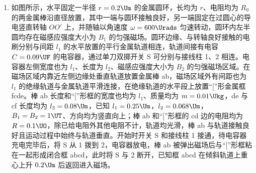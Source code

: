 \documentclass[\gkver]{gaokaozhenti}
\begin{document}
\begin{enumerate}
{	$mgl\sin37^{\circ}+mgR(1-\cos37^{\circ})=\frac{1}{2}mv_{C}^{2}$

	C 点时

	$F_{N}-mg=m\frac{v_{C}^{2}}{R}$

	$F_{N}=7\UN$

	（2）

	$mgl_{x}\sin37^{\circ}-4mgR\cos37^{\circ}=\frac{1}{2}mv^{2}$

	$v=\sqrt{12l_{x}-9.6}$

	能过最高点时，则能到 F 点，则恰到最高点时

	$mgl_{x}\sin37^{\circ}-mg(3R\cos37^{\circ}+R)=0$

	$l_{x}\geq0.85\Um$

	（3）设摩擦力做功为第一次到达中点时的 $n$ 倍

	$mgl_{x}\sin37^{\circ}-mg\frac{l_{FG}}{2}\sin37^{\circ}-n\mu mg\frac{l_{FG}}{2}\cos37^{\circ}=0$

	解得

	$l_{x}=\frac{7n+6}{15}$

	当 $n=1$ 时，$l_{x1}=\frac{13}{15}\Um$；当 $n=3$ 时，$l_{x2}=\frac{9}{5}\Um$；当 $n=5$ 时，$l_{x3}=\frac{41}{15}\Um$。
}

\item
如图所示，水平固定一半径 $r=0.2\Um$ 的金属圆环，长均为 $r$、电阻均为 $R_{0}$ 的两金属棒沿直径放置，其中一端与圆环接触良好，另一端固定在过圆心的导电竖直转轴 $OO'$ 上，并随轴以角速度 $\omega=600\Urads$ 匀速转动，圆环内左半圆均存在磁感应强度大小为 $B_{1}$ 的匀强磁场。圆环边缘、与转轴良好接触的电刷分别与间距 $l_{1}$ 的水平放置的平行金属轨道相连，轨道间接有电容 $C=0.09\UF$ 的电容器，通过单刀双掷开关 S 可分别与接线柱 1、2 相连。电容器左侧宽度也为 $l_{1}$、长度为 $l_{2}$、磁感应强度大小为 $B_{2}$ 的匀强磁场区域。在磁场区域内靠近左侧边缘处垂直轨道放置金属棒 ab，磁场区域外有间距也为 $l_{1}$ 的绝缘轨道与金属轨道平滑连接，在绝缘轨道的水平段上放置“[”形金属框 fcde。棒 ab 长度和“[”形框的宽度也均为 $l_{1}$、质量均为 $m=0.01\Ukg$，de 与 cf 长度均为 $l_{3}=0.08\Um$，已知 $l_{1}=0.25\Um$，$l_{2}=0.068\Um$，$B_{1}=B_{2}=1\UT$、方向均为竖直向上；棒 ab 和“[”形框的 cd 边的电阻均为 $R=0.1\UO$，除已给电阻外其他电阻不计，轨道均光滑，棒 ab 与轨道接触良好且运动过程中始终与轨道垂直。开始时开关 S 和接线柱 1 接通，待电容器充电完毕后，将 S 从 1 拨到 2，电容器放电，棒 ab 被弹出磁场后与“[”形框粘在一起形成闭合框 abcd，此时将 S 与 2 断开，已知框 abcd 在倾斜轨道上重心上升 $0.2\Um$ 后返回进入磁场。


\end{enumerate}
\end{document}
